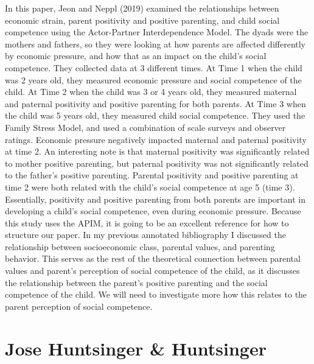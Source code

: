 \documentclass[man]{apa6}
\begin{document}
In this paper, Jeon and Neppl (2019) examined the relationships between economic strain, parent positivity and positive parenting, and child social competence using the Actor-Partner Interdependence Model. The dyads were the mothers and fathers, so they were looking at how parents are affected differently by economic pressure, and how that as an impact on the child's social competence. They collected data at 3 different times. At Time 1 when the child was 2 years old, they measured economic pressure and social competence of the child. At Time 2 when the child was 3 or 4 years old, they measured maternal and paternal positivity and positive parenting for both parents. At Time 3 when the child was 5 years old, they measured child social competence. They used the Family Stress Model, and used a combination of scale surveys and observer ratings. Economic pressure negatively impacted maternal and paternal positivity at time 2. An interesting note is that maternal positivity was significantly related to mother positive parenting, but paternal positivity was not significantly related to the father's positive parenting. Parental positivity and positive parenting at time 2 were both related with the child's social competence at age 5 (time 3). Essentially, positivity and positive parenting from both parents are important in developing a child's social competence, even during economic pressure. Because this study uses the APIM, it is going to be an excellent reference for how to structure our paper. In my previous annotated bibliography I discussed the relationship between socioeconomic class, parental values, and parenting behavior. This serves as the rest of the theoretical connection between parental values and parent's perception of social competence of the child, as it discusses the relationship between the parent's positive parenting and the social competence of the child. We will need to investigate more how this relates to the parent perception of social competence.

\hypertarget{jose-huntsinger-huntsinger}{%
\section{Jose Huntsinger \& Huntsinger}\label{jose-huntsinger-huntsinger}}
\end{document}
